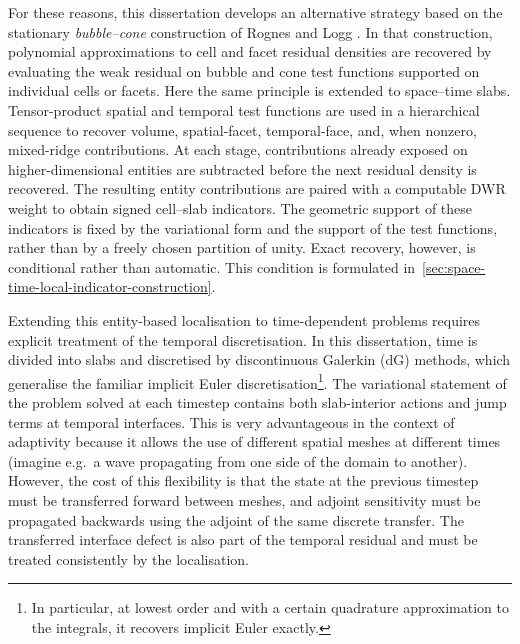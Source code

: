 For these reasons, this dissertation develops an alternative strategy based on the stationary \emph{bubble--cone} construction of Rognes and Logg \cite{Rognes_Logg_2013}. In that construction, polynomial approximations to cell and facet residual densities are recovered by evaluating the weak residual on bubble and cone test functions supported on individual cells or facets. Here the same principle is extended to space--time slabs. Tensor-product spatial and temporal test functions are used in a hierarchical sequence to recover volume, spatial-facet, temporal-face, and, when nonzero, mixed-ridge contributions. At each stage, contributions already exposed on higher-dimensional entities are subtracted before the next residual density is recovered. The resulting entity contributions are paired with a computable DWR weight to obtain signed cell--slab indicators.
The geometric support of these indicators is fixed by the variational form and the support of the test functions, rather than by a freely chosen partition of unity. Exact recovery, however, is conditional rather than automatic. This condition is formulated in~\cref{sec:space-time-local-indicator-construction}.

Extending this entity-based localisation to time-dependent problems requires explicit treatment of the temporal discretisation. In this dissertation, time is divided into slabs and discretised by discontinuous Galerkin (dG) methods, which generalise the familiar implicit Euler discretisation\footnote{In particular, at lowest order and with a certain quadrature approximation to the integrals, it recovers implicit Euler exactly.}. The variational statement of the problem solved at each timestep contains both slab-interior actions and jump terms at temporal interfaces. This is very advantageous in the context of adaptivity because it allows the use of different spatial meshes at different times (imagine e.g.\ a wave propagating from one side of the domain to another). However, the cost of this flexibility is that the state at the previous timestep must be transferred forward between meshes, and adjoint sensitivity must be propagated backwards using the adjoint of the same discrete transfer. The transferred interface defect is also part of the temporal residual and must be treated consistently by the localisation.

